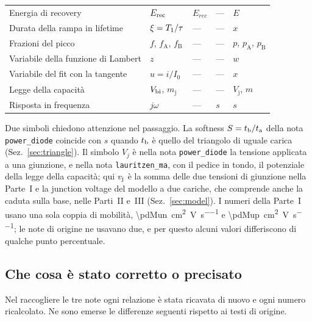 \documentclass[10pt,a4paper]{scrartcl}
\let\newcommand\pdvaluedefine
\newcommand{\ta}{t_\mathrm{a}}
\newcommand{\tb}{t_\mathrm{b}}
\newcommand{\Tone}{T_1}
\newcommand{\vj}{v_\mathrm{j}}
\newcommand{\Vbi}{V_\mathrm{bi}}
\newcommand{\Erec}{E_\mathrm{rec}}
\begin{document}
\begin{table}[htb]
\begin{tabular}{@{}>{\raggedright\arraybackslash}p{4.3cm}llll@{}}
Energia di recovery & $\Erec$ & $E_{rec}$ & --- & $E$ \\
Durata della rampa in lifetime & $\xi = \Tone/\tau$ & --- & --- & $x$ \\
Frazioni del picco & $f$, $f_\mathrm{A}$, $f_\mathrm{B}$ & --- & --- & $p$, $p_\mathrm{A}$, $p_\mathrm{B}$ \\
Variabile della funzione di Lambert & $z$ & --- & --- & $w$ \\
Variabile del fit con la tangente & $u = i/I_0$ & --- & --- & $x$ \\
Legge della capacità & $\Vbi$, $m_\mathrm{j}$ & --- & --- & $V_\mathrm{j}$, $m$ \\
Risposta in frequenza & $j\omega$ & --- & $s$ & $s$ \\
\bottomrule
\end{tabular}
\end{table}

Due simboli chiedono attenzione nel passaggio. La softness $S = \tb/\ta$ della nota \texttt{power\_diode} coincide con $s$ quando $\tb$ è quello del triangolo di uguale carica (Sez.~\ref{sec:triangle}). Il simbolo $V_j$ è nella nota \texttt{power\_diode} la tensione applicata a una giunzione, e nella nota \texttt{lauritzen\_ma}, con il pedice in tondo, il potenziale della legge della capacità; qui $\vj$ è la somma delle due tensioni di giunzione nella Parte~I e la junction voltage del modello a due cariche, che comprende anche la caduta sulla base, nelle Parti~II e~III (Sez.~\ref{sec:model}). I numeri della Parte~I usano una sola coppia di mobilità, \SI{\pdMun}{\centi\metre\squared\per\volt\per\second} e \SI{\pdMup}{\centi\metre\squared\per\volt\per\second}; le note di origine ne usavano due, e per questo alcuni valori differiscono di qualche punto percentuale.

\subsection{Che cosa è stato corretto o precisato}
Nel raccogliere le tre note ogni relazione è stata ricavata di nuovo e ogni numero ricalcolato. Ne sono emerse le differenze seguenti rispetto ai testi di origine.
\end{document}
